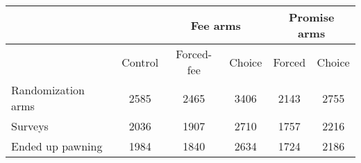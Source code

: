 \begin{tabular}{p{7.68em}ccccc}
\toprule
\multicolumn{1}{r}{} &       & \multicolumn{2}{c}{\cellcolor[rgb]{ .675,  .725,  .792}Fee arms} & \multicolumn{2}{c}{\cellcolor[rgb]{ .851,  .882,  .949}Promise arms} \\
\midrule
\multicolumn{1}{r}{} & \multicolumn{1}{p{4.045em}}{Control} & \multicolumn{1}{p{3.365em}}{Forced-fee} & \multicolumn{1}{p{4.045em}}{Choice} & \multicolumn{1}{p{4.045em}}{Forced} & \multicolumn{1}{p{4.045em}}{Choice } \\
\cmidrule{2-6}\rowcolor[rgb]{ .706,  .776,  .906} Randomization arms & \cellcolor[rgb]{ .851,  .882,  .949}2585 & \cellcolor[rgb]{ .851,  .882,  .949}2465 & \cellcolor[rgb]{ .851,  .882,  .949}3406 & \cellcolor[rgb]{ .851,  .882,  .949}2143 & \cellcolor[rgb]{ .851,  .882,  .949}2755 \\
Surveys & 2036  & 1907  & 2710  & 1757  & 2216 \\
\rowcolor[rgb]{ .706,  .776,  .906} Ended up pawning & \cellcolor[rgb]{ .851,  .882,  .949}1984 & \cellcolor[rgb]{ .851,  .882,  .949}1840 & \cellcolor[rgb]{ .851,  .882,  .949}2634 & \cellcolor[rgb]{ .851,  .882,  .949}1724 & \cellcolor[rgb]{ .851,  .882,  .949}2186 \\
\bottomrule
\bottomrule
\end{tabular}%
